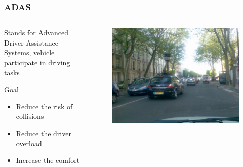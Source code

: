 \documentclass{beamer}
\begin{document}
	\begin{frame}
		\frametitle{ADAS}
		
		\begin{columns}[t]
		  \begin{column}{5cm}
			\begin{exampleblock}{Stands for}	
				Advanced Driver Assistance Systems, vehicle participate in driving tasks

			\end{exampleblock}		
			\begin{block}{Goal}
				\begin{itemize}
				\item Reduce the risk of collisions
				\item Reduce the driver overload
				\item Increase the comfort
				\end{itemize}
			\end{block}
		  \end{column}
		  
		  \begin{column}{5cm}
		  \begin{figure}[h]
			\center
			\includegraphics[scale=0.15]{img/fig:street:urban}
		  \end{figure}   
		  \end{column}
		 \end{columns}

	\end{frame}	
\end{document}
